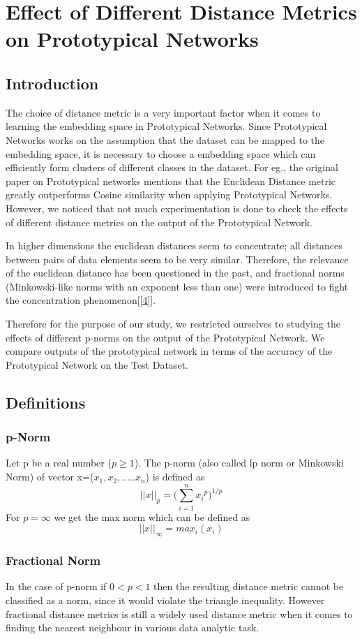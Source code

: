 \section{Effect of Different Distance Metrics on Prototypical Networks}
\subsection{Introduction}
The choice of distance metric is a very important factor when it comes to learning the embedding space in Prototypical Networks. Since Prototypical Networks works on the assumption that the dataset can be mapped to the embedding space, it is necessary to choose a embedding space which can efficiently form clusters of different classes in the dataset. For eg., the original paper on Prototypical networks mentions that the Euclidean Distance metric greatly outperforms Cosine similarity when applying Prototypical Networks. However, we noticed that not much experimentation is done to check the effects of different distance metrics on the output of the Prototypical Network.

In higher dimensions the euclidean distances seem to concentrate; all distances between pairs of data elements seem to be very similar. Therefore, the relevance of the euclidean distance has been questioned in the past, and fractional norms (Minkowski-like norms with an exponent less than one) were introduced to fight the concentration phenomenon[\ref{4}].

Therefore for the purpose of our study, we restricted ourselves to studying the effects of different p-norms on the output of the Prototypical Network. We compare outputs of the prototypical network in terms of the accuracy of the Prototypical Network on the Test Dataset.

\subsection{Definitions}
\subsubsection{p-Norm}
Let p be a real number (\(p\geq 1\)). The p-norm (also called lp norm or Minkowski Norm) of vector x=(\(x_1, x_2, .....x_n\)) is defined as 
\[
||x||_p = \Big(\sum_{i=1}^{n} {x_i}^{p}\Big)^{1/p} 
\] 
For \(p = \infty\) we get the max norm which can be defined as
\[ ||x||_{\infty} = max_{i}(x_i)\]
\subsubsection{Fractional Norm}
In the case of p-norm if \(0<p<1\) then the resulting distance metric cannot be classified as a norm, since it would violate the triangle inequality. However fractional distance metrics is still a widely used distance metric when it comes to finding the nearest neighbour in various data analytic task.

